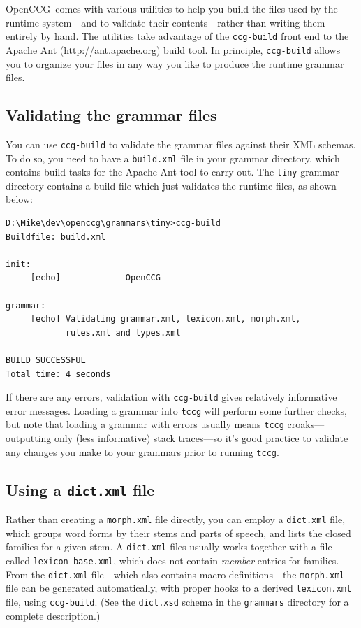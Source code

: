 \documentclass[11pt]{article}
\newcommand{\occg}{OpenCCG}
\begin{document}
\occg\ comes with various utilities to help you build the files used by
the runtime system---and to validate their contents---rather than
writing them entirely by hand. The utilities take advantage of the
\texttt{ccg-build} front end to the Apache Ant
(\url{http://ant.apache.org}) build tool. In principle,
\texttt{ccg-build} allows you to organize your files in any way you like
to produce the runtime grammar files.

\subsection{Validating the grammar files}

You can use \texttt{ccg-build} to validate the grammar files against
their XML schemas. To do so, you need to have a \texttt{build.xml} file
in your grammar directory, which contains build tasks for the Apache Ant
tool to carry out.  The \texttt{tiny} grammar directory contains a build
file which just validates the runtime files, as shown below:

\begin{small}
\begin{verbatim}
D:\Mike\dev\openccg\grammars\tiny>ccg-build
Buildfile: build.xml

init:
     [echo] ----------- OpenCCG ------------

grammar:
     [echo] Validating grammar.xml, lexicon.xml, morph.xml, 
            rules.xml and types.xml

BUILD SUCCESSFUL
Total time: 4 seconds
\end{verbatim}
\end{small}

\noindent If there are any errors, validation with \texttt{ccg-build}
gives relatively informative error messages. Loading a grammar into
\texttt{tccg} will perform some further checks, but note that loading a
grammar with errors usually means \texttt{tccg} croaks---outputting
only (less informative) stack traces---so it's good practice to validate
any changes you make to your grammars prior to running \texttt{tccg}.

\subsection{Using a \texttt{dict.xml} file}

Rather than creating a \texttt{morph.xml} file directly, you can employ
a \texttt{dict.xml} file, which groups word forms by their stems and
parts of speech, and lists the closed families for a given stem. A
\texttt{dict.xml} files usually works together with a file called
\texttt{lexicon-base.xml}, which does not contain \textsl{member}
entries for families. From the \texttt{dict.xml} file---which also
contains macro definitions---the \texttt{morph.xml} file can be
generated automatically, with proper hooks to a derived
\texttt{lexicon.xml} file, using \texttt{ccg-build}. (See the
\texttt{dict.xsd} schema in the \texttt{grammars} directory for a
complete description.)
\end{document}
